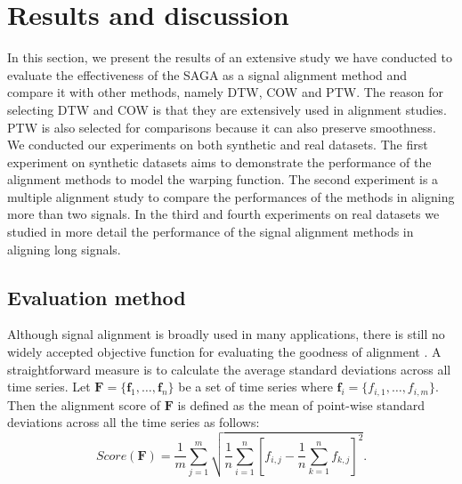 \documentclass[number,1p,12pt]{elsarticle}
\begin{document}
\section{Results and discussion}
In this section, we present the results of an extensive study we have conducted to evaluate the effectiveness of the SAGA as a signal alignment method and compare it with other methods, namely DTW, COW and PTW. The reason for selecting DTW and COW is that they are extensively used in alignment studies. PTW is also selected for comparisons because it can also preserve smoothness. We conducted our experiments on both synthetic and real datasets. The first experiment on synthetic datasets aims to demonstrate the performance of the alignment methods to model the warping function. The second experiment is a multiple alignment study to compare the performances of the methods in aligning more than two signals. In the third and fourth experiments on real datasets we studied in more detail the performance of the signal alignment methods in aligning long signals.

\subsection{Evaluation method}
Although signal alignment is broadly used in many applications, there is still no widely accepted objective function for evaluating the goodness of alignment \cite{Listgarten2007a}. A straightforward measure is to calculate the average standard deviations across all time series. Let $\mathbf{F}=\{\mathbf{f}_1,\ldots,\mathbf{f}_n\}$ be a set of time series where $\mathbf{f}_i = \{ f_{i,1},\ldots,f_{i,m}\}$. Then the alignment score of $\mathbf{F}$ is defined as the mean of point-wise standard deviations across all the time series as follows:
\begin{equation}
Score(\mathbf{F}) = \frac{1}{m}\sum_{j=1}^m \sqrt{\frac{1}{n}\sum_{i=1}^n \left[ f_{i,j}-\frac{1}{n}\sum_{k=1}^n  f_{k,j}\right]^2}.
\label{eq1DScore}
\end{equation}
\end{document}
